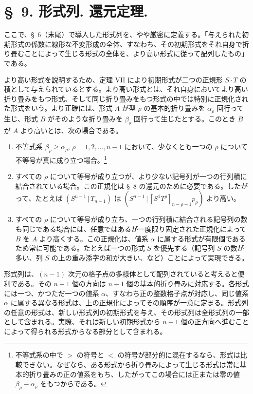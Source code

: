 \documentclass[11pt]{jlreq}
\newcommand{\pair}[2]{(#1\,|\,#2)}
\begin{document}
\section*{\S\ 9. 形式列. 還元定理.}
ここで、\S\ 6（末尾）で導入した形式列を、やや厳密に定義する。「与えられた初期形式の係数に線形な不変形成の全体、すなわち、その初期形式をそれ自身で折り畳むことによって生じる形式の全体を、より高い形式に従って配列したもの」である。

より高い形式を説明するため、定理 VII により初期形式が二つの正規形 $S\cdot T$ の積として与えられているとする。より高い形式とは、それ自身においてより高い折り畳みをもつ形式、そして同じ折り畳みをもつ形式の中では特別に正規化された形式をいう。より正確には、形式 $A$ が型 $\rho$ の基本的折り畳みを $\alpha_\rho$ 回行って生じ、形式 $B$ がそのような折り畳みを $\beta_\rho$ 回行って生じたとする。このとき $B$ が $A$ より高いとは、次の場合である。
\begin{enumerate}
\item 不等式系 $\beta_\rho\ge\alpha_\rho$, $\rho=1,2,\ldots,n-1$ において、少なくとも一つの $\rho$ について不等号が真に成り立つ場合。\footnote{不等式系の中で $>$ の符号と $<$ の符号が部分的に混在するなら、形式は比較できない。なぜなら、ある形式から折り畳みによって生じる形式は常に基本的折り畳みの正の値系をもち、したがってこの場合には正または零の値 $\beta_\rho-\alpha_\rho$ をもつからである。}
\item すべての $\rho$ について等号が成り立つが、より少ない記号列が一つの行列積に結合されている場合。この正規化は \S\ 8 の還元のために必要である。したがって、たとえば $\pair{S^{n-1}}{T_{n-1}}$ は $\pair{S^{n-1}}{[S^1T^\rho]_{n-\rho-1}p_\rho}$ より高い。
\item すべての $\rho$ について等号が成り立ち、一つの行列積に結合される記号列の数も同じである場合には、任意ではあるが一度限り固定された正規化によって $B$ を $A$ より高くする。この正規化は、値系 $\alpha$ に属する形式が有限個であるため常に可能である。たとえば一つの形式 $S$ を優先する（記号列 $S$ の数が多い、列 $S$ の上の重み添字の和が大きい、など）ことによって実現できる。
\end{enumerate}
形式列は、$(n-1)$ 次元の格子点の多様体として配列されていると考えると便利である。その $n-1$ 個の方向は $n-1$ 個の基本的折り畳みに対応する。各形式には一つ、かつただ一つの値系 $\alpha$、すなわち正の整数格子点が対応し、同じ値系 $\alpha$ に属する異なる形式は、上の正規化によってその順序が一意に定まる。形式列の任意の形式は、新しい形式列の初期形式を与え、その形式列は全形式列の一部として含まれる。実際、それは新しい初期形式から $n-1$ 個の正方向へ進むことによって得られる形式からなる部分として含まれる。
\end{document}
